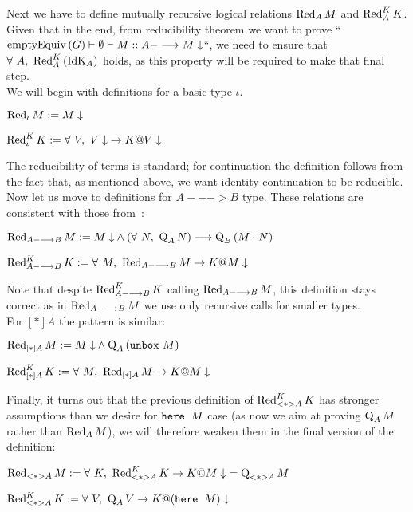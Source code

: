 Next we have to define mutually recursive logical relations $\Red{M}{A}$ and $\RedK{K}{A}$. Given that in the end, from reducibility theorem we want to prove ``$\emptyEq G |- \nnil |- M :: A ---> \termin{M}$``, we need to ensure that $\forall\ A,\ \RedK{(\IdK{A})}{A}$ holds, as this property will be required to make that final step.\\

\newpage
We will begin with definitions for a basic type $\iota$.
\begin{description}
\item $\Red{M}{\iota} := \termin{M}$
\item $\RedK{K}{\iota} := \forall\ V,\ \termin{V} -> \termin{K @ V}$
\end{description}
The reducibility of terms is standard; for continuation the definition follows from the fact that, as mentioned above, we want identity continuation to be reducible.\\

Now let us move to definitions for $A ---> B$ type. These relations are consistent with those from~\cite{contextmabi}:
\begin{description}
\item $\Red{M}{A ---> B} := \termin{M} \wedge (\forall \ N,\ \Q{N}{A}) --> \Q{(\appl{M}{N})}{B}$
\item $\RedK{K}{A ---> B} := \forall\ M,\ \Red{M}{A--->B} -> \termin{K @ M}$
\end{description}
Note that despite $\RedK{K}{A--->B}$ calling $\Red{M}{A--->B}$, this definition stays correct as in $\Red{M}{A--->B}$ we use only recursive calls for smaller types.\\

For $[*]A$ the pattern is similar:
\begin{description}
\item $\Red{M}{[*]A} := \termin{M} \wedge \Q{(\unboxe{}\ {M})}{A}$
\item $\RedK{K}{[*]A} := \forall\ M,\ \Red{M}{[*]A} -> \termin{K @ M}$
\end{description}

Finally, it turns out that the previous definition of $\RedK{K}{<*>A}$ has stronger assumptions than we desire for $\here{M}$ case (as now we aim at proving $\Q{M}{A}$ rather than $\Red{M}{A}$), we will therefore weaken them in the final version of the definition:
\begin{description}
\item $\Red{M}{<*>A} := \forall\ K,\ \RedK{K}{<*>A}-> \termin{K@M} = \Q{M}{<*>A}$
\item $\RedK{K}{<*>A}:= \forall\ V,\ \Q{V}{A} -> \termin{K@(\here{M})}$
\end{description}


